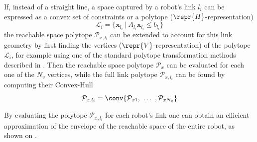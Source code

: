 If, instead of a straight line, a space captured by a robot's link $l_i$ can be expressed as a convex set of constraints or a polytope ($\repr{H}$-representation)
\begin{equation}
    \mathcal{L}_i = \Big \{ \bm{x}_{l_i} ~ |~ A_{l_i} \bm{x}_{l_i} \leq b_{l_i} \Big\}
\end{equation}
the reachable space polytope $\mathcal{P}_{x,l_i}$ can be extended to account for this link geometry by first finding the vertices ($\repr{V}$-representation) of the polytope $\mathcal{L}_i$, for example using one of the standard polytope transformation methods described in . Then the reachable space polytope $\mathcal{P}_{x}$ can be evaluated for each one of the $N_v$ vertices, while the full link polytope $\mathcal{P}_{x,l_i}$ can be found by computing their Convex-Hull
\begin{equation}
    \mathcal{P}_{x,l_i} = \conv{  \mathcal{P}_{x1}, ~ \dots ~, \mathcal{P}_{xN_v} }
\end{equation}

By evaluating the polytope $\mathcal{P}_{x,l_i}$ for each robot's link one can obtain an efficient approximation of the envelope of the reachable space of the entire robot, as shown on .


